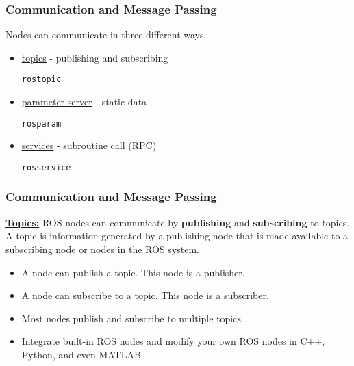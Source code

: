 \documentclass[fleqn]{beamer} %
\newcommand{\sectiontitleII}{Communication and Message Passing}
\begin{document}
	\begin{frame}[label=sectionII,containsverbatim] \small
		\frametitle{\sectiontitleII}
		
                  {\large  Nodes can communicate in three different ways. }
                        \begin{itemize}
                            \item \href{http://wiki.ros.org/Topics}{\underline{topics}} - publishing and subscribing 
                            \begin{lstlisting}
rostopic                             
                            \end{lstlisting}
                            \item \href{http://wiki.ros.org/Parameter\%20Serverparameters}{\underline{parameter server}} - static data 
                            \begin{lstlisting}
rosparam                        
                            \end{lstlisting}
                            \item \href{http://wiki.ros.org/Services}{\underline{services}} - subroutine call (RPC) 
                            \begin{lstlisting}
rosservice                      
                            \end{lstlisting}
                        \end{itemize}    


	\end{frame}

	\begin{frame}[containsverbatim] \small
		\frametitle{\sectiontitleII}

\href{http://wiki.ros.org/Topics}{\bf Topics:} ROS nodes can communicate by {\bf publishing} and {\bf subscribing} to topics. A topic is information generated by a publishing node that is made available to a subscribing node or nodes in the ROS system.
        
        \begin{itemize}		
            \item A node can publish a topic. This node is a publisher.    	
            \item A node can subscribe to a topic. This node is a subscriber.
            \item Most nodes publish and subscribe to multiple topics. 
            \item Integrate built-in ROS nodes and modify your own ROS nodes in C++, Python, and even MATLAB
            
        \end{itemize}
        
	\end{frame}
\end{document}
